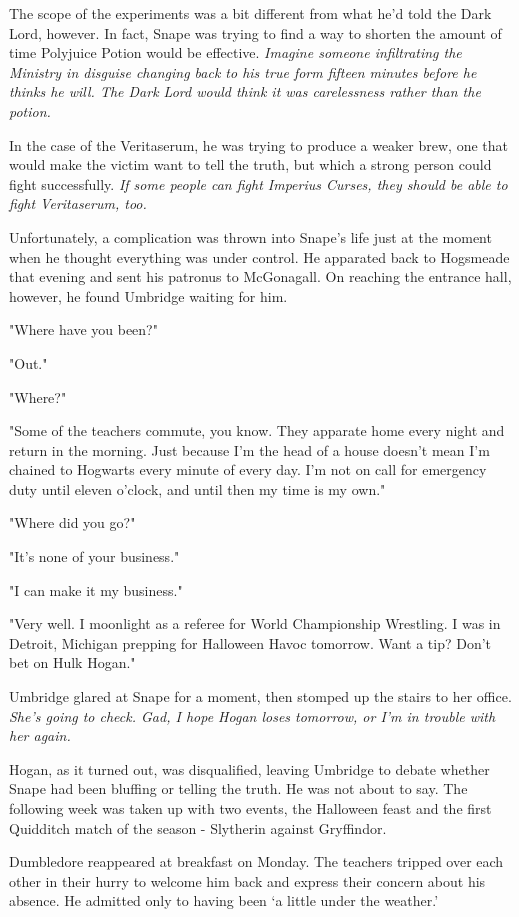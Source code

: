 The scope of the experiments was a bit different from what he'd told the Dark Lord, however. In fact, Snape was trying to find a way to shorten the amount of time Polyjuice Potion would be effective. \emph{Imagine someone infiltrating the Ministry in disguise changing back to his true form fifteen minutes before he thinks he will. The Dark Lord would think it was carelessness rather than the potion.}

In the case of the Veritaserum, he was trying to produce a weaker brew, one that would make the victim want to tell the truth, but which a strong person could fight successfully. \emph{If some people can fight Imperius Curses, they should be able to fight Veritaserum, too.}

Unfortunately, a complication was thrown into Snape's life just at the moment when he thought everything was under control. He apparated back to Hogsmeade that evening and sent his patronus to McGonagall. On reaching the entrance hall, however, he found Umbridge waiting for him.

"Where have you been?"

"Out."

"Where?"

"Some of the teachers commute, you know. They apparate home every night and return in the morning. Just because I'm the head of a house doesn't mean I'm chained to Hogwarts every minute of every day. I'm not on call for emergency duty until eleven o'clock, and until then my time is my own."

"Where did you go?"

"It's none of your business."

"I can make it my business."

"Very well. I moonlight as a referee for World Championship Wrestling. I was in Detroit, Michigan prepping for Halloween Havoc tomorrow. Want a tip? Don't bet on Hulk Hogan."

Umbridge glared at Snape for a moment, then stomped up the stairs to her office. \emph{She's going to check. Gad, I hope Hogan loses tomorrow, or I'm in trouble with her again.}

Hogan, as it turned out, was disqualified, leaving Umbridge to debate whether Snape had been bluffing or telling the truth. He was not about to say. The following week was taken up with two events, the Halloween feast and the first Quidditch match of the season - Slytherin against Gryffindor.

Dumbledore reappeared at breakfast on Monday. The teachers tripped over each other in their hurry to welcome him back and express their concern about his absence. He admitted only to having been `a little under the weather.'


